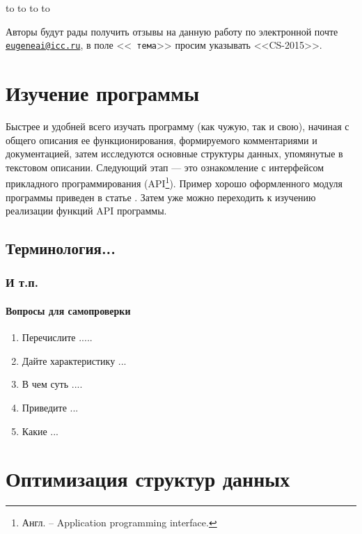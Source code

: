 \documentclass[14pt, openany, twoside, draft]{extbook} %
\newenvironment{questions}{\subsubsection*{Вопросы для самопроверки}\begin{enumerate}\itemsep0pt minus 0.3pt\parskip0pt plus 0.3pt}{\end{enumerate}}
\begin{document}
\medskip
\noindent\hbox to \linewidth{\hfill\sf Старший~научный сотрудник ИДСТУ СО РАН,}
\noindent\hbox to \linewidth{\hfill\sf доцент кафедры ИТ ИМЭИ ИГУ}
\noindent\hbox to \linewidth{\hfill\sf кандидат~технических~наук}
\noindent\hbox to \linewidth{\hfill\sf Е.~А.~Черкашин}

\vfill
\makeatletter
{} Авторы будут рады получить отзывы на данную
работу по электронной почте
\href{mailto:eugeneai@icc.ru}{\tt{}eugeneai@icc.ru}, в поле <<{\tt
  тема}>> просим указывать <<CS-2015>>.
\makeatother

\chapter{Изучение программы}

Быстрее и удобней всего изучать программу (как чужую, так и свою),
начиная с общего описания ее функционирования, формируемого
комментариями и документацией, затем исследуются основные структуры
данных, упомянутые в текстовом описании.  Следующий этап --- это
ознакомление с интерфейсом прикладного
программирования (API\footnote{Англ. -- Application programming
  interface.}).  Пример хорошо оформленного модуля программы
приведен в статье \cite{fogel2009}.  Затем уже можно переходить к
изучению реализации функций API программы.



\section{Терминология...}


\subsection{И т.п.}


\begin{questions}
\item{} Перечислите .....
\item{} Дайте характеристику ...
\item{} В чем суть ....
\item{} Приведите ...
\item{} Какие ...
\end{questions}

\chapter{Оптимизация структур данных}
\end{document}
